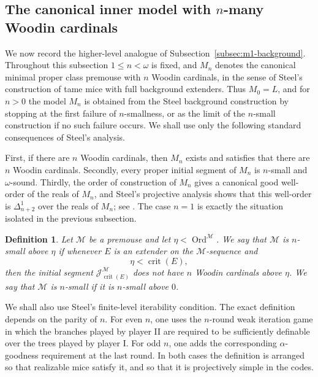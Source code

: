 \documentclass[a4paper,11pt]{article}
\newtheorem{definition}[theorem]{Definition}
\begin{document}
\subsection{The canonical inner model with $n$-many Woodin cardinals}\label{subsec:mn-background}

We now record the higher-level analogue of Subsection~\ref{subsec:m1-background}.  Throughout this subsection $1\leq n<\omega$ is fixed, and $M_n$ denotes the canonical minimal proper class premouse with $n$ Woodin cardinals, in the sense of Steel's construction of tame mice with full background extenders.  Thus $M_0=L$, and for $n>0$ the model $M_n$ is obtained from the Steel background construction by stopping at the first failure of $n$-smallness, or as the limit of the $n$-small construction if no such failure occurs.  We shall use only the following standard consequences of Steel's analysis.

First, if there are $n$ Woodin cardinals, then $M_n$ exists and satisfies that there are $n$ Woodin cardinals.  Secondly, every proper initial segment of $M_n$ is $n$-small and $\omega$-sound.  Thirdly, the order of construction of $M_n$ gives a canonical good well-order of the reals of $M_n$, and Steel's projective analysis shows that this well-order is $\Delta^1_{n+2}$ over the reals of $M_n$; see \cite{Steel2,Steel3}.  The case $n=1$ is exactly the situation isolated in the previous subsection.

\begin{definition}\label{def:n-smallness-general}
Let $\mathcal M$ be a premouse and let $\eta<\operatorname{Ord}^{\mathcal M}$.  We say that $\mathcal M$ is \emph{$n$-small above $\eta$} if whenever $E$ is an extender on the $\mathcal M$-sequence and
\[
   \eta<\operatorname{crit}(E),
\]
then the initial segment $\mathcal J^{\mathcal M}_{\operatorname{crit}(E)}$ does not have $n$ Woodin cardinals above $\eta$.  We say that $\mathcal M$ is \emph{$n$-small} if it is $n$-small above $0$.
\end{definition}

We shall also use Steel's finite-level iterability condition.  The exact definition depends on the parity of $n$.  For even $n$, one uses the $n$-round weak iteration game in which the branches played by player II are required to be sufficiently definable over the trees played by player I.  For odd $n$, one adds the corresponding $\alpha$-goodness requirement at the last round.  In both cases the definition is arranged so that realizable mice satisfy it, and so that it is projectively simple in the codes.
\end{document}
